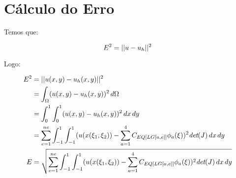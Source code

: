 \section{Cálculo do Erro}

  Temos que:

  \[E^2 = ||u - u_h||^2\]

  Logo:

  \begin{align*}
    E^2 &= ||u(x,y) - u_h(x,y)||^2 \\
    &= \int_{\Omega}(u(x,y) - u_h(x,y))^2 \,d\Omega \\
    &= \int_{0}^{1}\int_{0}^{1}(u(x,y) - u_h(x,y))^2 \,dx \,dy \\
    &= \sum_{e=1}^{ne} \int_{-1}^{1}\int_{-1}^{1}(u(x(\xi_1, \xi_2)) - \sum_{a=1}^{4}C_{EQ[LG[a,e]]}\phi_a(\xi))^2 \textit{det}(J) \,dx \,dy \\
    E &= \sqrt{\sum_{e=1}^{ne} \int_{-1}^{1}\int_{-1}^{1}(u(x(\xi_1, \xi_2)) - \sum_{a=1}^{4}C_{EQ[LG[a,e]]}\phi_a(\xi))^2 \textit{det}(J) \,dx \,dy} \\
  \end{align*}
